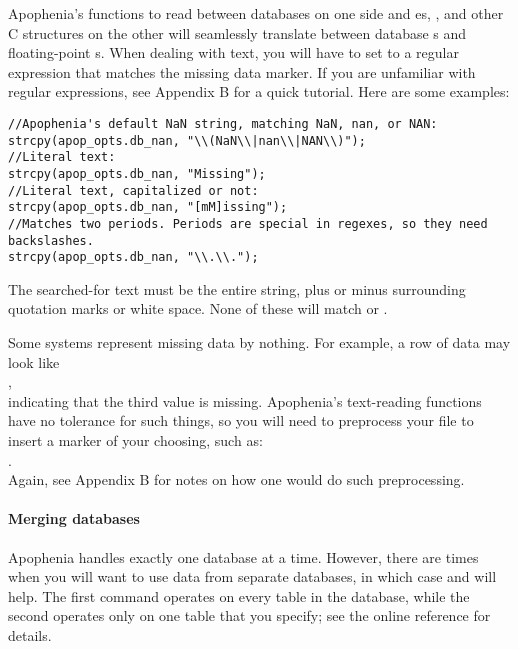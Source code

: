 Apophenia's functions to read between databases on one side and
es, , and other C structures on the
other will seamlessly translate between database s and
floating-point s. When dealing with text, you will have
to set  to a regular expression that matches the
missing data marker. If you are unfamiliar with regular expressions, see
Appendix B for a quick tutorial. Here are some examples:
\begin{lstlisting}
//Apophenia's default NaN string, matching NaN, nan, or NAN:
strcpy(apop_opts.db_nan, "\\(NaN\\|nan\\|NAN\\)");
//Literal text:
strcpy(apop_opts.db_nan, "Missing");
//Literal text, capitalized or not:
strcpy(apop_opts.db_nan, "[mM]issing");
//Matches two periods. Periods are special in regexes, so they need backslashes.
strcpy(apop_opts.db_nan, "\\.\\.");
\end{lstlisting}
The searched-for text must be the entire string, plus or minus
surrounding quotation marks or white space. None of these will match
 or .

Some systems represent missing data by nothing. For example, a row of
data may look like\\
,\\
indicating that the third value is missing. Apophenia's text-reading
functions have no tolerance for such things, so you will need to
preprocess your file to insert a marker of your choosing, such as:\\
.\\
Again, see Appendix B for notes on how one would do such preprocessing.


\paragraph{Merging databases} Apophenia handles exactly one database at
a time. However, there are times when you will want to use data
from separate databases, in which case  and
 will help.  The first command
operates on every table in the database, while the second operates only
on one table that you specify; see the online reference for details.


